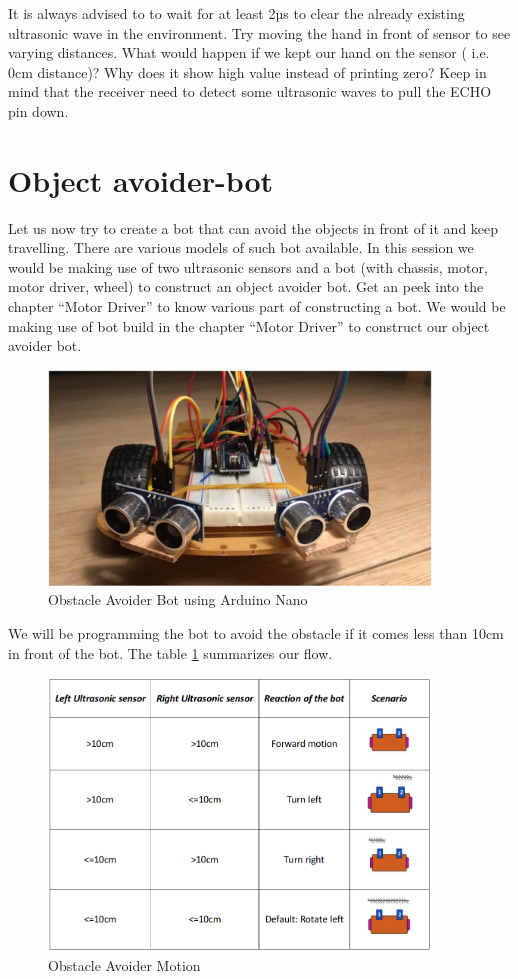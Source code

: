 It is always advised to to wait for at least 2µs to clear the already existing ultrasonic wave in the environment. Try moving the hand in front of sensor to see varying distances. What would happen if we kept our hand on the sensor ( i.e. 0cm distance)? Why does it show high value instead of printing zero? Keep in mind that the receiver need to detect some ultrasonic waves to pull the ECHO pin down.

\section{Object avoider-bot}

Let us now try to create a bot that can avoid the objects in front of it and keep travelling. There are various models of such bot available. In this session we would be making use of two ultrasonic sensors and a bot (with chassis, motor, motor driver, wheel) to construct an object avoider bot. Get an peek into the chapter “Motor Driver” to know various part of constructing a bot. We would be making use of bot build in the chapter “Motor Driver” to construct our object avoider bot.

\begin{figure}
    \centering
    \includegraphics[width=4in]{Images/Ultrasonic/nano_obj_avoider1.png}
    \caption[Obstacle Avoider Bot]{Obstacle Avoider Bot using Arduino Nano}
\end{figure}

We will be programming the bot to avoid the obstacle if it comes less than 10cm in front of the bot. The table \ref{fig: obj_avoider_motion} summarizes our flow.

\begin{figure}
    \centering
    \includegraphics[width=4in]{Tables/Ultrasonic/obj_avoider_movement.png}
    \caption{Obstacle Avoider Motion}
    \label{fig: obj_avoider_motion}
\end{figure}


